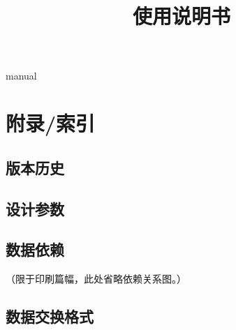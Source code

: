 \documentclass[CJK, hyperref, oneside]{z-book}
\title {\modsubtitle \\ 使用说明书}
\begin{document}
\renewcommand*\sectionmark[1]{\markright{\thesection. #1}}
\renewcommand*\thesection{\arabic{section}}

\date{}
\maketitle

\renewcommand\contentsname{目录/Contents}
\tableofcontents
\clearpage

\def\DIRNAME{.}
{manual}

\clearpage
\section{附录/索引}

    \subsection{版本历史}
    {
        \centering
        
    }

                                        \begin{landscape}
    \subsection{设计参数}

    \subsection{数据依赖}
        （限于印刷篇幅，此处省略依赖关系图。）

    \clearpage
    \subsection{数据交换格式}
        

                                        \end{landscape}

    \listoftables
    \listoffigures
\end{document}
